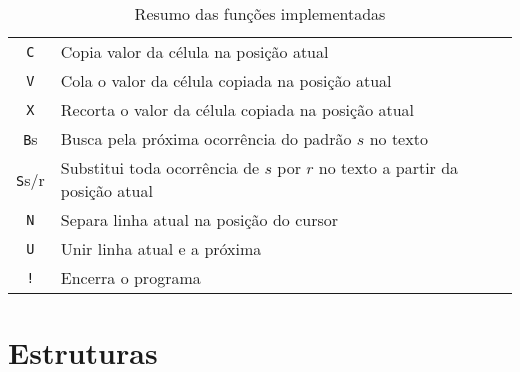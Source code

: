 \documentclass[a4paper, 11pt]{article}
\begin{document}
\begin{table}[H]
\begin{tabularx}{\linewidth}{|c|X|}
      \texttt{ C } &  Copia valor da célula na posição atual\\
      \texttt{ V } &  Cola o valor da célula copiada na posição atual \\
      \texttt{ X } &  Recorta o valor da célula copiada na posição atual\\
      \texttt{B}s &  Busca pela próxima ocorrência do padrão $s$ no texto\\
      \texttt{S}s/r &  Substitui toda ocorrência de $s$ por $r$ no texto a partir da posição atual\\
      \texttt{ N } &  Separa linha atual na posição do cursor\\
      \texttt{ U } &  Unir linha atual e a próxima \\
      \texttt{!} &  Encerra o programa \\
      \hline
      \end{tabularx}
      \caption*{Resumo das funções implementadas}
\end{table}

\tableofcontents

\section{Estruturas}
\end{document}
